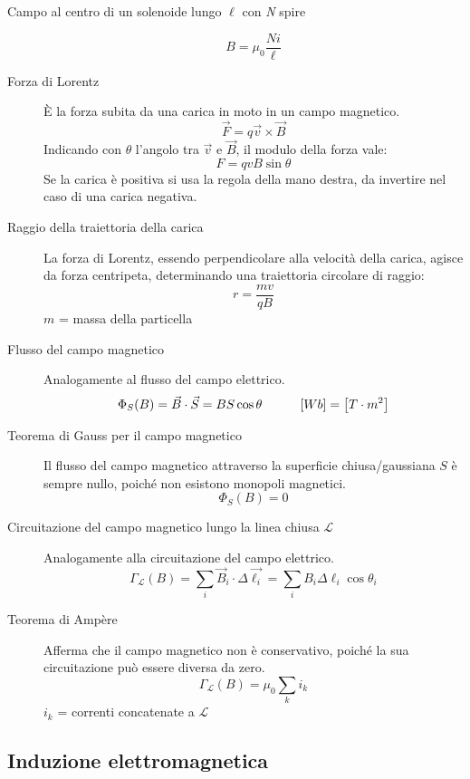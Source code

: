 \documentclass[a4paper,11pt,italian]{article}
\begin{document}
\begin{description}
  \item[Campo al centro di un solenoide lungo $ \ell $ con \textit{N} spire]
  \[ B = \mu_0 \frac{Ni}{\ell}\]
  
  \item[Forza di Lorentz] 
  È la forza subita da una carica in moto in un campo magnetico.
  \[ \vec{F} = q \vec{v} \times \vec{B} \]
  Indicando con $ \theta $ l'angolo tra $ \vec{v} $ e $ \vec{B} $, il modulo della forza vale:
  \[ F = qvB\sin \theta \]
  Se la carica è positiva si usa la regola della mano destra, da invertire nel caso di una carica negativa.
  
  \item[Raggio della traiettoria della carica] 
  La forza di Lorentz, essendo perpendicolare alla velocità della carica, agisce da forza centripeta, determinando una traiettoria circolare di raggio:
  \[ r = \frac{mv}{qB} \]
  $ m $ = massa della particella

  
  \item[Flusso del campo magnetico] 
  Analogamente al flusso del campo elettrico.
  \[ \Phi_S(B) = \vec{B} \cdot \vec{S} = B S \cos \theta \hspace*{3em} [Wb] = \left[ T \cdot m^2 \right] \]
  
  \item[Teorema di Gauss per il campo magnetico] 
  Il flusso del campo magnetico attraverso la superficie chiusa/gaussiana $ S $ è sempre nullo, poiché non esistono monopoli magnetici.
  \[ \Phi_S(B) = 0 \]
  
  \item[Circuitazione del campo magnetico lungo la linea chiusa $ \mathscr{L} $]\label{conc:circuitazioneB}
  Analogamente alla circuitazione del campo elettrico.
  \[ \Gamma_\mathscr{L}(B) = \sum_i \vec{B}_i \cdot \Delta\vec{\ell_i} = \sum_i B_i \Delta \ell_i \cos \theta_i \]
  
  \item[Teorema di Ampère] 
  Afferma che il campo magnetico non è conservativo, poiché la sua circuitazione può essere diversa da zero.
  \[ \Gamma_\mathscr{L}(B) = \mu_0 \sum_k i_k \]
  $ i_k $ = correnti concatenate a $ \mathscr{L} $
\end{description}

\subsection{Induzione elettromagnetica}
\end{document}
